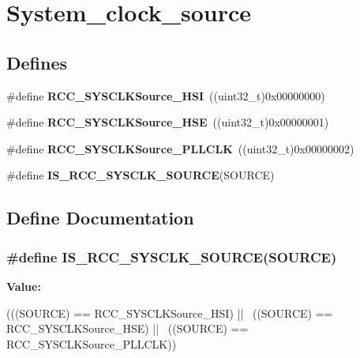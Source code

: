 \hypertarget{group__System__clock__source}{
\section{System\_\-clock\_\-source}
\label{group__System__clock__source}
}
\subsection*{Defines}
\begin{DoxyCompactItemize}
\item 
\hypertarget{group__System__clock__source_ga0f392254e74dd965c48edd5aad148e20}{
\#define {\bfseries RCC\_\-SYSCLKSource\_\-HSI}~((uint32\_\-t)0x00000000)}
\label{group__System__clock__source_ga0f392254e74dd965c48edd5aad148e20}

\item 
\hypertarget{group__System__clock__source_gabeae110e41833842f8620647ea0ce85a}{
\#define {\bfseries RCC\_\-SYSCLKSource\_\-HSE}~((uint32\_\-t)0x00000001)}
\label{group__System__clock__source_gabeae110e41833842f8620647ea0ce85a}

\item 
\hypertarget{group__System__clock__source_ga9301b7a07a7cb8c2c6ed87b619c1c966}{
\#define {\bfseries RCC\_\-SYSCLKSource\_\-PLLCLK}~((uint32\_\-t)0x00000002)}
\label{group__System__clock__source_ga9301b7a07a7cb8c2c6ed87b619c1c966}

\item 
\#define {\bfseries IS\_\-RCC\_\-SYSCLK\_\-SOURCE}(SOURCE)
\end{DoxyCompactItemize}


\subsection{Define Documentation}
\hypertarget{group__System__clock__source_gaae9d6172a72b0a90cb3703aa59258c57}{
\subsubsection[{IS\_\-RCC\_\-SYSCLK\_\-SOURCE}]{\setlength{\rightskip}{0pt plus 5cm}\#define IS\_\-RCC\_\-SYSCLK\_\-SOURCE(SOURCE)}}
\label{group__System__clock__source_gaae9d6172a72b0a90cb3703aa59258c57}
{\bfseries Value:}
\begin{DoxyCode}
(((SOURCE) == RCC_SYSCLKSource_HSI) || \
                                      ((SOURCE) == RCC_SYSCLKSource_HSE) || \
                                      ((SOURCE) == RCC_SYSCLKSource_PLLCLK))
\end{DoxyCode}
